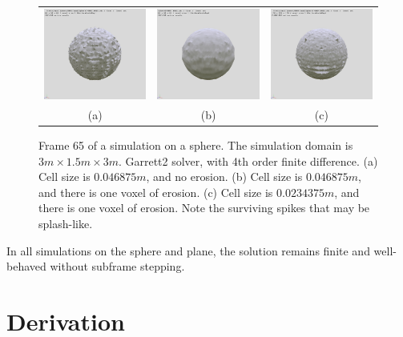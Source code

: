 \documentclass{article}
\begin{document}
\begin{figure}
\begin{center}
\begin{tabular}{ccc}
\includegraphics[width=1.5in]{../graphics/sphere_lowres_noteroded.jpg} &
\includegraphics[width=1.5in]{../graphics/sphere_lowres_eroded.jpg} &
\includegraphics[width=1.5in]{../graphics/sphere_hires_eroded.jpg} \\
(a) & (b) & (c)
\end{tabular}
\end{center}
\caption{ Frame 65 of a simulation on a sphere. The simulation domain is $3 m \times 1.5 m \times 3m$. Garrett2 solver, with 4th order finite difference. 
(a) Cell size is $0.046875 m$, and no erosion.
(b) Cell size is $0.046875 m$, and there is one voxel of erosion.
(c) Cell size is $0.0234375 m$, and there is one voxel of erosion. Note the surviving spikes that may be splash-like.
  } \label{spherewedgefig}
\end{figure}

In all simulations on the sphere and plane, the solution remains finite and well-behaved without subframe stepping.  

\section{Derivation}\label{derivation}
\end{document}
